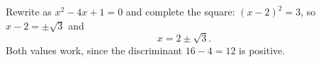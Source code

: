 Rewrite as $x^2-4x+1=0$ and complete the square: $(x-2)^2=3$, so $x-2=\pm\sqrt3$ and
\[x=\boxed{2\pm\sqrt3}.\]
Both values work, since the discriminant $16-4=12$ is positive.
